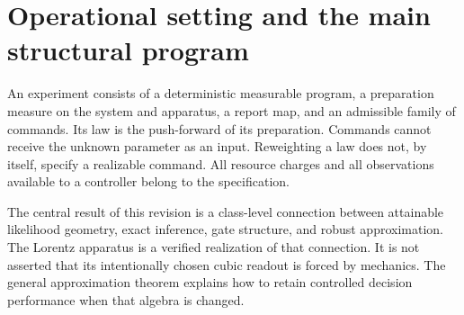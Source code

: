 \section{Operational setting and the main structural program}\label{sec:framework}
An experiment consists of a deterministic measurable program, a preparation measure on the system and apparatus, a report map, and an admissible family of commands. Its law is the push-forward of its preparation. Commands cannot receive the unknown parameter as an input. Reweighting a law does not, by itself, specify a realizable command. All resource charges and all observations available to a controller belong to the specification.

The central result of this revision is a class-level connection between attainable likelihood geometry, exact inference, gate structure, and robust approximation. The Lorentz apparatus is a verified realization of that connection. It is not asserted that its intentionally chosen cubic readout is forced by mechanics. The general approximation theorem explains how to retain controlled decision performance when that algebra is changed.


